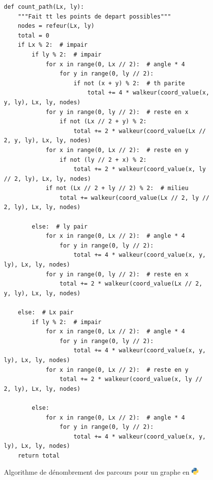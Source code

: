 \documentclass[twoside, a4paper, 12pt]{report}
\newcommand{\pythonlogo}{\includegraphics[width=1em , height=2ex]{python128.png}}
\begin{document}
\begin{figure}[h]%
\begin{lstlisting}[frame=single]
def count_path(Lx, ly):
    """Fait tt les points de depart possibles"""
    nodes = refeur(Lx, ly)
    total = 0
    if Lx % 2:  # impair
        if ly % 2:  # impair
            for x in range(0, Lx // 2):  # angle * 4
                for y in range(0, ly // 2):
                    if not (x + y) % 2:  # th parite
                        total += 4 * walkeur(coord_value(x, y, ly), Lx, ly, nodes)
            for y in range(0, ly // 2):  # reste en x
                if not (Lx // 2 + y) % 2:
                    total += 2 * walkeur(coord_value(Lx // 2, y, ly), Lx, ly, nodes)
            for x in range(0, Lx // 2):  # reste en y
                if not (ly // 2 + x) % 2:
                    total += 2 * walkeur(coord_value(x, ly // 2, ly), Lx, ly, nodes)
            if not (Lx // 2 + ly // 2) % 2:  # milieu
                total += walkeur(coord_value(Lx // 2, ly // 2, ly), Lx, ly, nodes)
        
        else:  # ly pair
            for x in range(0, Lx // 2):  # angle * 4
                for y in range(0, ly // 2):
                    total += 4 * walkeur(coord_value(x, y, ly), Lx, ly, nodes)
            for y in range(0, ly // 2):  # reste en x
                total += 2 * walkeur(coord_value(Lx // 2, y, ly), Lx, ly, nodes)
            
    else:  # Lx pair
        if ly % 2:  # impair
            for x in range(0, Lx // 2):  # angle * 4
                for y in range(0, ly // 2):
                    total += 4 * walkeur(coord_value(x, y, ly), Lx, ly, nodes)
            for x in range(0, Lx // 2):  # reste en y
                total += 2 * walkeur(coord_value(x, ly // 2, ly), Lx, ly, nodes)
            
        else:
            for x in range(0, Lx // 2):  # angle * 4
                for y in range(0, ly // 2):
                    total += 4 * walkeur(coord_value(x, y, ly), Lx, ly, nodes)
    return total

\end{lstlisting}
\caption[Algorithme de dénombrement des parcours pour un graphe en Python]{Algorithme de dénombrement des parcours pour un graphe en \pythonlogo}
\end{figure}
\end{document}
